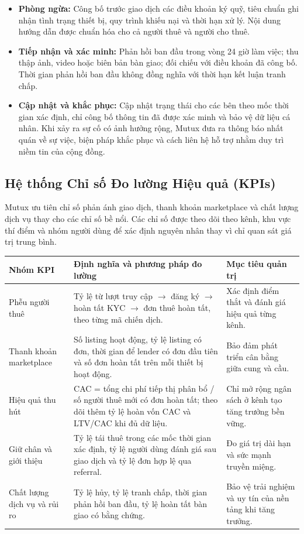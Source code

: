 \begin{itemize}
    \item \textbf{Phòng ngừa:} Công bố trước giao dịch các điều khoản ký quỹ, tiêu chuẩn ghi nhận tình trạng thiết bị, quy trình khiếu nại và thời hạn xử lý. Nội dung hướng dẫn được chuẩn hóa cho cả người thuê và người cho thuê.
    \item \textbf{Tiếp nhận và xác minh:} Phản hồi ban đầu trong vòng 24 giờ làm việc; thu thập ảnh, video hoặc biên bản bàn giao; đối chiếu với điều khoản đã công bố. Thời gian phản hồi ban đầu không đồng nghĩa với thời hạn kết luận tranh chấp.
    \item \textbf{Cập nhật và khắc phục:} Cập nhật trạng thái cho các bên theo mốc thời gian xác định, chỉ công bố thông tin đã được xác minh và bảo vệ dữ liệu cá nhân. Khi xảy ra sự cố có ảnh hưởng rộng, Mutux đưa ra thông báo nhất quán về sự việc, biện pháp khắc phục và cách liên hệ hỗ trợ nhằm duy trì niềm tin của cộng đồng.
\end{itemize}

\subsection{Hệ thống Chỉ số Đo lường Hiệu quả (KPIs)}

Mutux ưu tiên chỉ số phản ánh giao dịch, thanh khoản marketplace và chất lượng dịch vụ thay cho các chỉ số bề nổi. Các chỉ số được theo dõi theo kênh, khu vực thí điểm và nhóm người dùng để xác định nguyên nhân thay vì chỉ quan sát giá trị trung bình.

\begin{longtable}{@{}p{}p{}p{}@{}}
\toprule
\textbf{Nhóm KPI} & \textbf{Định nghĩa và phương pháp đo lường} & \textbf{Mục tiêu quản trị} \\
\midrule
\endhead
Phễu người thuê & Tỷ lệ từ lượt truy cập $\rightarrow$ đăng ký $\rightarrow$ hoàn tất KYC $\rightarrow$ đơn thuê hoàn tất, theo từng mã chiến dịch. & Xác định điểm thắt và đánh giá hiệu quả từng kênh. \\
Thanh khoản marketplace & Số listing hoạt động, tỷ lệ listing có đơn, thời gian để lender có đơn đầu tiên và số đơn hoàn tất trên mỗi thiết bị hoạt động. & Bảo đảm phát triển cân bằng giữa cung và cầu. \\
Hiệu quả thu hút & CAC = tổng chi phí tiếp thị phân bổ / số người thuê mới có đơn hoàn tất; theo dõi thêm tỷ lệ hoàn vốn CAC và LTV/CAC khi đủ dữ liệu. & Chỉ mở rộng ngân sách ở kênh tạo tăng trưởng bền vững. \\
Giữ chân và giới thiệu & Tỷ lệ tái thuê trong các mốc thời gian xác định, tỷ lệ người dùng đánh giá sau giao dịch và tỷ lệ đơn hợp lệ qua referral. & Đo giá trị dài hạn và sức mạnh truyền miệng. \\
Chất lượng dịch vụ và rủi ro & Tỷ lệ hủy, tỷ lệ tranh chấp, thời gian phản hồi ban đầu, tỷ lệ hoàn tất bàn giao có bằng chứng. & Bảo vệ trải nghiệm và uy tín của nền tảng khi tăng trưởng. \\
\bottomrule
\end{longtable}

